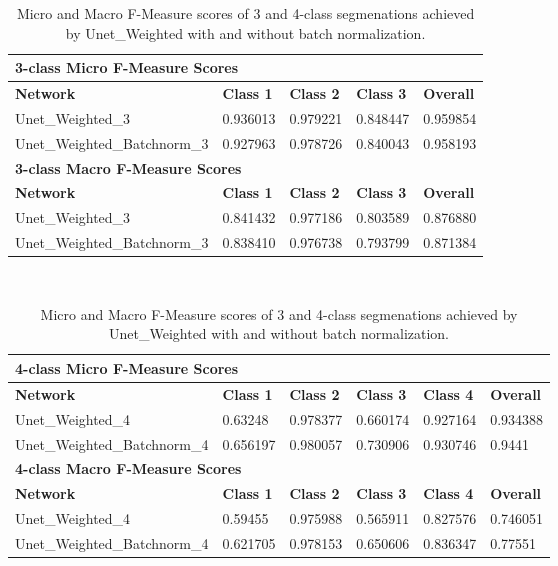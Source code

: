 \begin {table}
	\begin{flushleft}
		\begin {tabular}[!ht]{|l|l|l|l|l|}
			\hline\multicolumn{5}{|l|}{\textbf{3-class Micro F-Measure Scores}} \\ \hline
			\textbf{Network}& \textbf{Class 1}& \textbf{Class 2}& \textbf{Class 3}& \textbf{Overall} \\ \hline
			Unet\_Weighted\_3& 0.936013& 0.979221& 0.848447& 0.959854 \\ \hline
			Unet\_Weighted\_Batchnorm\_3& 0.927963&  0.978726& 0.840043& 0.958193\\ \hline
			\multicolumn{5}{|l|}{\textbf{3-class Macro F-Measure Scores}} \\ \hline
			\textbf{Network}& \textbf{Class 1}& \textbf{Class 2}& \textbf{Class 3}& \textbf{Overall} \\ \hline
			Unet\_Weighted\_3& 0.841432& 0.977186&0.803589& 0.876880 \\ \hline
			Unet\_Weighted\_Batchnorm\_3& 0.838410& 0.976738& 0.793799& 0.871384\\ \hline
		\end {tabular}
		\vspace{0.5cm}\\
		\begin {tabular}[!ht]{|l|l|l|l|l|l|}
			\hline\multicolumn{6}{|l|}{\textbf{4-class Micro F-Measure Scores}} \\ \hline
			\textbf{Network}& \textbf{Class 1}& \textbf{Class 2}& \textbf{Class 3}& \textbf{Class 4}& \textbf{Overall} \\ \hline
			Unet\_Weighted\_4& 0.63248& 0.978377& 0.660174& 0.927164& 0.934388 \\ \hline
			Unet\_Weighted\_Batchnorm\_4& \cellcolor{green!25}0.656197& \cellcolor{green!25}0.980057& \cellcolor{green!25}0.730906& \cellcolor{green!25}0.930746& \cellcolor{green!25}0.9441\\ \hline
			\multicolumn{6}{|l|}{\textbf{4-class Macro F-Measure Scores}} \\ \hline
			\textbf{Network}& \textbf{Class 1}& \textbf{Class 2}& \textbf{Class 3}& \textbf{Class 4}& \textbf{Overall} \\ \hline
			Unet\_Weighted\_4& 0.59455& 0.975988& 0.565911& 0.827576& 0.746051 \\ \hline
			Unet\_Weighted\_Batchnorm\_4& \cellcolor{green!25}0.621705& \cellcolor{green!25}0.978153& \cellcolor{green!25}0.650606& \cellcolor{green!25}0.836347& \cellcolor{green!25}0.77551\\ \hline
		\end {tabular}
	\end {flushleft}

\caption[Micro and Macro F-Measure scores for a network with and without Batch Normalization.]{Micro and Macro F-Measure scores of 3 and 4-class segmenations achieved by Unet\_Weighted with and without batch normalization.}
\label{tab:results2}
\end {table}


